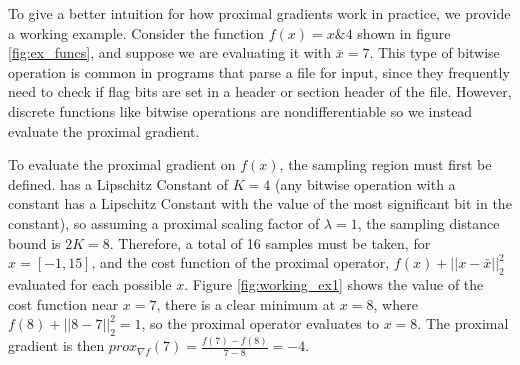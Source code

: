 To give a better intuition for how proximal gradients work in practice, we provide a working example. Consider the function $f(x) =   x \texttt{\&} 4$ shown in figure \ref{fig:ex_funcs}, and suppose we are evaluating it with $\bar{x} = 7$. This type of bitwise operation is common in programs that parse a file for input, since they frequently need to check if flag bits are set in a header or section header of the file. However, discrete functions like bitwise operations are nondifferentiable so we instead evaluate the proximal gradient.

To evaluate the proximal gradient on $f\left(x\right)$, the sampling region must first be defined.  has a Lipschitz Constant of $K=4$ (any bitwise operation with a constant has a Lipschitz Constant with the value of the most significant bit in the constant), so assuming a proximal scaling factor of $\lambda = 1$, the sampling distance bound is $2K = 8$. Therefore, a total of 16 samples must be taken, for $x = [-1, 15]$, and the cost function of the proximal operator, $f(x) + ||x - \bar{x}||_2^2$ evaluated for each possible $x$. Figure \ref{fig:working_ex1} shows the value of the cost function near $x = 7$, there is a clear minimum at $x=8$, where $f\left(8\right) + ||8-7||_2^2 = 1$, so the proximal operator evaluates to $x=8$. The proximal gradient is then $prox_{\nabla f}\left(7\right) = \frac{f\left(7\right) - f\left(8\right)}{7 - 8} = -4$.


